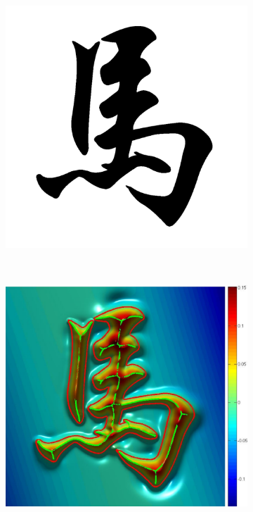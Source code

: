 \documentclass[review]{acmsiggraph}
\begin{document}
\begin{figure}
        \centering
		\begin{subfigure}[b]{0.16\linewidth}
                \centering
                \includegraphics[width=\textwidth]{images/horse/horse.pdf}
        \end{subfigure}
        ~
		\begin{subfigure}[b]{0.18\linewidth}
                \centering
                \includegraphics[width=\textwidth]{images/horse/horse_3d.pdf}

\end{subfigure}
\end{figure}
\end{document}
